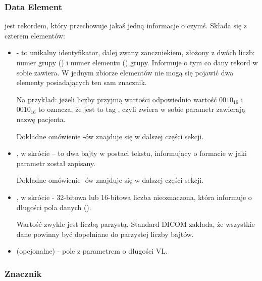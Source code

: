 \subsubsection{Data Element}

 jest rekordem, który przechowuje jakaś jedną informacje o czymś.
Składa się z czterem elementów:

\begin{itemize}

    \item {} - to unikalny identyfikator, dalej zwany zanczniekiem, złożony z dwóch liczb: numer grupy () i numer elementu () grupy.
          Informuje o tym co dany rekord w sobie zawiera.
          W jednym zbiorze elementów nie mogą się pojawić dwa elementy posiadających ten sam znacznik.

          Na przykład: jeżeli liczby  przyjmą wartości odpowiednio wartość $0010_{16}$ i $0010_{16}$ to oznacza, że jest to tag , czyli zwiera w sobie parametr zawierają nazwę pacjenta.

          Dokładne omówienie -ów znajduje się w dalszej części sekcji.

    \item {}, w skrócie  – to dwa bajty w postaci tekstu, informujący o formacie w jaki parametr został zapisany.

          Dokładne omówienie -ów znajduje się w dalszej części sekcji.

    \item {}, w skrócie  - 32-bitowa lub 16-bitowa liczba nieoznaczona, która informuje o długości pola danych ().

          Wartość  zwykle jest liczbą parzystą.
          Standard DICOM zakłada, że wszystkie dane powinny być dopełniane do parzystej liczby bajtów.

    \item {} (opcjonalne) - pole z parametrem o długości VL.

\end{itemize}

\subsubsection{Znacznik}
\label{sec:dicom-tag}

